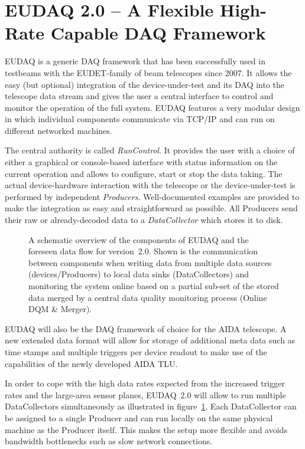 \documentclass[paper=a4, fontsize=11pt, titlepage]{scrartcl}	%
\numberwithin{equation}{section}		%
\numberwithin{figure}{section}			%
\numberwithin{table}{section}           	%
\begin{document}
\section{EUDAQ 2.0 -- A Flexible High-Rate Capable DAQ Framework}

EUDAQ is a generic DAQ framework that has been successfully used in
testbeams with the EUDET-family of beam telescopes since 2007.  It
allows the easy (but optional) integration of the device-under-test
and its DAQ into the telescope data stream and gives the user a
central interface to control and monitor the operation of the full
system. EUDAQ features a very modular design in which individual
components communicate via TCP/IP and can run on different networked
machines.

The central authority is called \emph{RunControl}. It provides the
user with a choice of either a graphical or console-based interface
with status information on the current operation and allows to
configure, start or stop the data taking. The actual device-hardware
interaction with the telescope or the device-under-test is performed
by independent \emph{Producers}. Well-documented examples are provided
to make the integration as easy and straightforward as possible. All
Producers send their raw or already-decoded data to a
\emph{DataCollector} which stores it to disk.

    \begin{figure}[hbt]\centering
      
      \caption{A schematic overview of the components of EUDAQ and the
        foreseen data flow for version~2.0. Shown is the communication between
        components when writing data from multiple data sources
        (devices/Producers) to local data sinks (DataCollectors) and
        monitoring the system online based on a partial sub-set of the
        stored data merged by a central data quality monitoring
        process (Online DQM \& Merger).}
  \label{fig:mdc}
\end{figure}


EUDAQ will also be the DAQ framework of choice for the AIDA
telescope. A new extended data format will allow for storage of additional
meta data such as time stamps and multiple triggers per device readout
to make use of the capabilities of the newly developed AIDA TLU.

In order to cope with the high data rates expected from the
increased trigger rates and the large-area sensor planes, EUDAQ~2.0
will allow to run multiple DataCollectors simultaneously as illustrated in
figure~\ref{fig:mdc}. Each DataCollector can be assigned to a single
Producer and can run locally on the same physical machine as the
Producer itself. This makes the setup more flexible and 
avoids bandwidth bottlenecks such as slow network connections.
\end{document}
